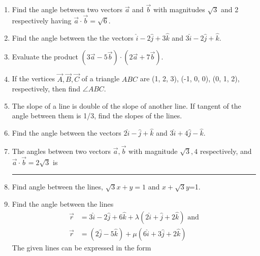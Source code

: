 \begin{enumerate}[label=\thesubsection.\arabic*, ref=\thesubsection.\theenumi]
\item Find the angle between two vectors $\overrightarrow{a}$ and $\overrightarrow {b} $ with magnitudes $\sqrt{3}$ and 2 respectively having $\overrightarrow {a}\cdot\overrightarrow {b}=\sqrt{6}$.
		\label{prob:12/10/3/1/inner}
	\\
	\solution
		
\item Find the angle between the the vectors $\hat{i}-2\hat{j}+3\hat{k}$ and $3\hat{i}-2\hat{j}+\hat{k}$.
	\\
	\solution
		
\item Evaluate the product $(3\overrightarrow {a}-5\overrightarrow {b})\cdot (2\overrightarrow {a}+7\overrightarrow {b})$.
	\\
	\solution
		
\item If the vertices $\vec{A}, \vec{B}, \vec{C}$ of a triangle $ABC$ are (1, 2, 3),  (-1, 0, 0),  (0, 1, 2),  respectively,  then find  $\angle{ABC}$.
	\\
	\solution
		
	\item The slope of a line is double of the slope of another line. If tangent of the angle between them is 1/3,  find the slopes of the lines.
\label{chapters/11/10/1/11}
\\
\solution 

\item Find the angle between the vectors $2\hat{i}-\hat{j}+\hat{k}$ and $3\hat{i}+4\hat{j}-\hat{k}$.
\item The angles between two vectors $\vec{a},  \vec{b}$ with magnitude $\sqrt{3},  4$ respectively,  and $\vec{a} \cdot \vec{b}= 2\sqrt{3}$ is \rule{1cm}{0.1pt}
\item    Find angle between the lines,  $\sqrt{3}x+y=1$ and $x+\sqrt{3}y$=1.
\label{chapters/11/10/3/9}
\\
   \solution 

\item Find the angle between the lines 
\begin{align}
	\overrightarrow{r}&=3\hat{i}-2\hat{j}+6\hat{k}+\lambda(2\hat{i}+\hat{j}+2\hat{k})
	\text{ and}
	\\
	\overrightarrow{r}&=(2\hat{j}-5\hat{k})+\mu(6\hat{i}+3\hat{j}+2\hat{k})
\end{align}
%
\solution  The given lines can be expressed  in the form 

\end{enumerate}

